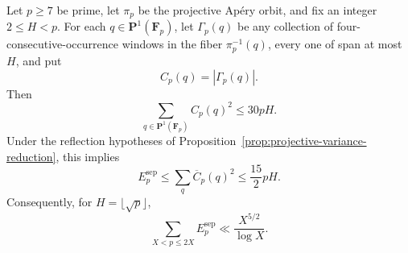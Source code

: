 \begin{proposition}
\label{prop:projective-short-chain-energy}
Let $p\ge7$ be prime, let $\pi_p$ be the projective Ap\'ery orbit, and
fix an integer $2\le H<p$.  For each
$q\in\mathbf P^1(\mathbf F_p)$, let $\Gamma_p(q)$ be any collection of
four-consecutive-occurrence windows in the fiber $\pi_p^{-1}(q)$, every
one of span at most~$H$, and put
\[
 C_p(q)=|\Gamma_p(q)|.
\]
Then
\begin{equation}
 \sum_{q\in\mathbf P^1(\mathbf F_p)}C_p(q)^2\le30pH.
\label{eq:projective-short-chain-energy}
\end{equation}
Under the reflection hypotheses of
Proposition~\ref{prop:projective-variance-reduction}, this implies
\[
 E_p^{\mathrm{sep}}
 \le\sum_q\overline C_p(q)^2
 \le\frac{15}{2}pH.
\]
Consequently, for $H=\lfloor\sqrt p\rfloor$,
\[
 \sum_{X<p\le2X}E_p^{\mathrm{sep}}
 \ll\frac{X^{5/2}}{\log X}.
\]
\end{proposition}

